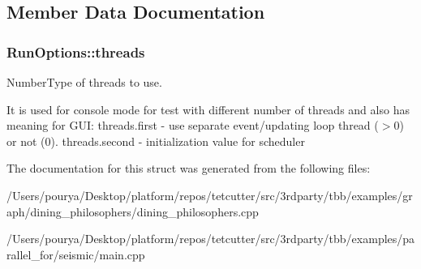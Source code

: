 \subsection{Member Data Documentation}
\hypertarget{structRunOptions_aaec23c1325e3da318e63d168a606e7e8}{}
\subsubsection[{threads}]{ Run\+Options\+::threads}\label{structRunOptions_aaec23c1325e3da318e63d168a606e7e8}


Number\+Type of threads to use. 

It is used for console mode for test with different number of threads and also has meaning for G\+U\+I\+: threads.\+first -\/ use separate event/updating loop thread ($>$0) or not (0). threads.\+second -\/ initialization value for scheduler 

The documentation for this struct was generated from the following files\+:\begin{DoxyCompactItemize}
\item 
/\+Users/pourya/\+Desktop/platform/repos/tetcutter/src/3rdparty/tbb/examples/graph/dining\+\_\+philosophers/dining\+\_\+philosophers.\+cpp\item 
/\+Users/pourya/\+Desktop/platform/repos/tetcutter/src/3rdparty/tbb/examples/parallel\+\_\+for/seismic/main.\+cpp\end{DoxyCompactItemize}
